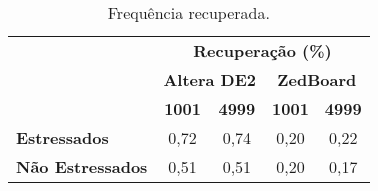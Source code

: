 \begin{table}[H]
\centering
\caption{Frequência recuperada.}
\begin{tabular}{l|cccc|}
\cline{2-5}
 & \multicolumn{4}{c|}{\textbf{Recuperação (\%)}} \\ \cline{2-5} 
 & \multicolumn{2}{c|}{\textbf{Altera DE2}} & \multicolumn{2}{c|}{\textbf{ZedBoard}} \\ \cline{2-5} 
 & \multicolumn{1}{c|}{\textbf{1001}} & \multicolumn{1}{c|}{\textbf{4999}} & \multicolumn{1}{c|}{\textbf{1001}} & \textbf{4999} \\ \hline
\multicolumn{1}{|l|}{\textbf{Estressados}} & \multicolumn{1}{c|}{0,72} & \multicolumn{1}{c|}{0,74} & \multicolumn{1}{c|}{0,20} & 0,22 \\ \hline
\multicolumn{1}{|l|}{\textbf{Não Estressados}} & \multicolumn{1}{c|}{0,51} & \multicolumn{1}{c|}{0,51} & \multicolumn{1}{c|}{0,20} & 0,17 \\ \hline
\end{tabular}
\label{tab:Relax}
\end{table}